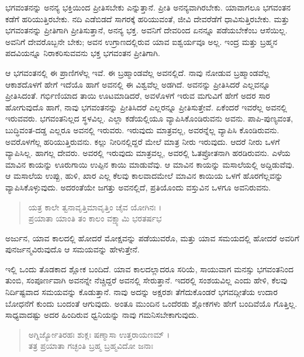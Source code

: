 ಭಗವಂತನನ್ನು ಅನನ್ಯ ಭಕ್ತಿಯಿಂದ ಪ್ರೀತಿಸಬೇಕು ಎನ್ನುತ್ತಾನೆ. ಪ್ರೀತಿ ಅನನ್ಯವಾಗಿರಬೇಕು. ಯಾವಾಗಲೂ ಭಗವಂತನ ಕಡೆಗೆ ಹರಿಯುತ್ತಿರಬೇಕು. ನದಿ ಎಡೆಬಿಡದೆ ಸಾಗರಕ್ಕೆ ಹರಿಯುವಂತೆ, ಜೀವಿ ದೇವರೆಡೆಗೆ ಧಾವಿಸುತ್ತಿರಬೇಕು. ಮತ್ತು ಭಗವಂತನನ್ನು ಪ್ರೀತಿಗಾಗಿ ಪ್ರೀತಿಸುತ್ತಾನೆ, ಅನನ್ಯ ಭಕ್ತ. ಅವನಿಗೆ ದೇವರಿಂದ ಏನನ್ನೂ ಪಡೆಯಬೇಕೆಂಬ ಆಸೆಯಿಲ್ಲ. ಅವನಿಗೆ ದೇವರೊಬ್ಬನೇ ಬೇಕು; ಅವನ ಉಗ್ರಾಣದಲ್ಲಿರುವ ಯಾವ ಐಶ್ವರ್ಯವೂ ಅಲ್ಲ. ಇಂದ್ರ ಮತ್ತು ಬ್ರಹ್ಮನ ಪದವಿಯನ್ನೂ ನಿರಾಕರಿಸುವವನು ಭಕ್ತ ಭಗವಂತನ ಪ್ರೀತಿಗಾಗಿ.

ಆ ಭಗವಂತನಲ್ಲಿ ಈ ಪ್ರಾಣಿಗಳೆಲ್ಲ ಇವೆ. ಈ ಬ್ರಹ್ಮಾಂಡವೆಲ್ಲ ಅವನಲ್ಲಿದೆ. ನಾವು ನೋಡುವ ಬ್ರಹ್ಮಾಂಡವೆಲ್ಲ ಆಕಾಶದೊಳಗೆ ಹೇಗೆ ಇದೆಯೊ ಹಾಗೆ ಅವನಲ್ಲಿ ಈ ವಿಶ್ವವೆಲ್ಲ ಅಡಗಿದೆ. ಅವನನ್ನು ಪ್ರೀತಿಸಿದರೆ ಎಲ್ಲವನ್ನೂ ಪ್ರೀತಿಸಿದಂತೆ. ಗರ್ಭಿಣಿಯಾದ ತಾಯಿ ಊಟಮಾಡಿದರೆ, ಅವಳೊಳಗೆ ಇರುವ ಮಗುವಿಗೆ ಹೇಗೆ ಅದರ ಸಾರ ಹೋಗುವುದೊ ಹಾಗೆ, ನಾವು ಭಗವಂತನನ್ನು ಪ್ರೀತಿಸಿದರೆ ಎಲ್ಲರನ್ನೂ ಪ್ರೀತಿಸುತ್ತೇವೆ. ಏಕೆಂದರೆ ಇವರೆಲ್ಲ ಅವನಲ್ಲಿ ಇರುವವರು. ಭಗವಂತನಿಲ್ಲದ ಸ್ಥಳವಿಲ್ಲ. ಎಲ್ಲಾ ಕಡೆಯಲ್ಲಿಯೂ ವ್ಯಾಪಿಸಿಕೊಂಡಿರುವನು ಅವನು. ಪಾಪಿ-ಪುಣ್ಯವಂತ, ಬುದ್ಧಿವಂತ-ದಡ್ಡ ಎಲ್ಲರೂ ಅವನಲ್ಲಿ ಇರುವರು. ಇರುವುದು ಮಾತ್ರವಲ್ಲ, ಅವರನ್ನೆಲ್ಲ ವ್ಯಾಪಿಸಿ ಕೊಂಡಿರುವನು. ಅವರೊಳಗೆಲ್ಲ ಹರಿಯುತ್ತಿರುವನು. ಕಲ್ಲು ನೀರಿನಲ್ಲಿದ್ದರೆ ಮೇಲೆ ಮಾತ್ರ ನೀರು ಇರುವುದು. ಆದರೆ ನೀರು ಒಳಗೆ ವ್ಯಾಪಿಸಿಲ್ಲ. ಹಾಗಲ್ಲ ದೇವರು. ಅವರಲ್ಲಿ ಇರುವುದು ಮಾತ್ರವಲ್ಲ, ಅವರಲ್ಲಿ ಓತಪ್ರೋತನಾಗಿ ಹರಡಿರುವನು. ಎಳೆಯ ಮಾವಿನ ಕಾಯನ್ನು ಊರುಗಾಯಿ ಉಪ್ಪಿನ ಕಾಯಿ ಮಾಡುವೆವು. ಆ ಮಾವಿನ ಕಾಯನ್ನು ಮಸಾಲೆಯಲ್ಲಿ ಅದ್ದಿಡುವೆವು. ಆ ಮಸಾಲೆಯ ಉಪ್ಪು, ಹುಳಿ, ಖಾರ ಎಲ್ಲ ಕೆಲವು ಕಾಲವಾದಮೇಲೆ ಮಾವಿನ ಕಾಯಿಯ ಒಳಗೆ ಹೊರಗೆಲ್ಲವನ್ನು ವ್ಯಾಪಿಸಿಕೊಳ್ಳುವುದು. ಅದರಂತೆಯೇ ಜಗತ್ತು ಅವನಲ್ಲಿದೆ, ಪ್ರತಿಯೊಂದು ವಸ್ತುವಿನ ಒಳಗೂ ಅವನಿರುವನು.

\begin{verse}
ಯತ್ರ ಕಾಲೇ ತ್ವನಾವೃತ್ತಿಮಾವೃತ್ತಿಂ ಚೈವ ಯೋಗಿನಃ ।\\ಪ್ರಯಾತಾ ಯಾಂತಿ ತಂ ಕಾಲಂ ವಕ್ಷ್ಯಾಮಿ ಭರತರ್ಷಭ 
\end{verse}

{\small ಅರ್ಜುನ, ಯಾವ ಕಾಲದಲ್ಲಿ ಹೋದರೆ ಮೋಕ್ಷವನ್ನು ಪಡೆಯುವರೊ, ಮತ್ತು ಯಾವ ಸಮಯದಲ್ಲಿ ಹೋದರೆ ಅವರಿಗೆ ಪುನರ್ಜನ್ಮವಿರುವುದೊ ಆ ಸಮಯವನ್ನು ಹೇಳುತ್ತೇನೆ.}

ಇಲ್ಲಿ ಒಂದು ತೊಡಕಾದ ಶ್ಲೋಕ ಬಂದಿದೆ. ಯಾವ ಕಾಲದಲ್ಲಾದರೂ ಸರಿಯೆ, ಸಾಯುವಾಗ ಮನಸ್ಸು ಭಗವಂತನಿಂದ ತುಂಬಿ, ಸಂಪೂರ್ಣವಾಗಿ ಅವನನ್ನೇ ನೆಚ್ಚಿದ್ದರೆ ಅವನಲ್ಲಿ ಸೇರುತ್ತಾನೆ. ಇದರಲ್ಲಿ ಸಂಶಯವಿಲ್ಲ ಎಂದು ಹೇಳಿ, ಕೆಲವು ನಿರ್ದಿಷ್ಟವಾದ ಸಮಯವನ್ನು ಕೊಡುತ್ತಾನೆ. ನಾವು ಅದನ್ನು ಅಕ್ಷರಶಃ ತೆಗೆದುಕೊಂಡರೆ ಭಗವದ್ಗೀತೆಯ ಉದಾರ ಬೋಧನೆಗೆ ಕುಂದು ಬಂದಂತೆ ಆಗುವುದು. ಅಂತೂ ಮುಂದಿನ ಒಂದೆರಡು ಶ್ಲೋಕಗಳು ಹೇಗೆ ಬಂದಿವೆಯೊ ಗೊತ್ತಿಲ್ಲ. ಸಾಧ್ಯವಾದಷ್ಟು ಅದರ ಹಿಂದಿರುವ ಧ್ವನಿಯನ್ನು ನಾವು ಗಮನಿಸಬೇಕಾಗುವುದು.

\begin{verse}
ಅಗ್ನಿರ್ಜ್ಯೋತಿರಹಃ ಶುಕ್ಲಃ ಷಣ್ಮಾಸಾ ಉತ್ತರಾಯಣಮ್ ।\\ತತ್ರ ಪ್ರಯಾತಾ ಗಚ್ಛಂತಿ ಬ್ರಹ್ಮ ಬ್ರಹ್ಮವಿದೋ ಜನಾಃ 
\end{verse}


